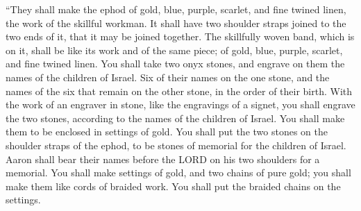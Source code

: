 \myverse{}“They shall make the ephod of gold, blue, purple, scarlet, and
fine twined linen, the work of the skillful workman.
\myverse{}It shall have two shoulder straps joined to the two ends of it, that it may
be joined together.
\myverse{}The skillfully woven band, which is on it, shall be like its work and of the
same piece; of gold, blue, purple, scarlet, and fine twined linen.
\myverse{}You shall take two onyx stones, and engrave on them the names of the children
of Israel.
\myverse{}Six of their names on the one stone, and the names of the six that remain
on the other stone, in the order of their birth.
\myverse{}With the work of an engraver in stone, like the engravings of a signet, you
shall engrave the two stones, according to the names of the children of Israel. You shall make them to
be enclosed in settings of gold.
\myverse{}You shall put the two stones on the shoulder straps of the ephod, to be stones
of memorial for the children of Israel. Aaron shall bear their names before the LORD on his two shoulders
for a memorial.
\myverse{}You shall make settings of gold,
\myverse{}and two chains of pure gold; you shall make them like cords of braided work.
You shall put the braided chains on the settings.


